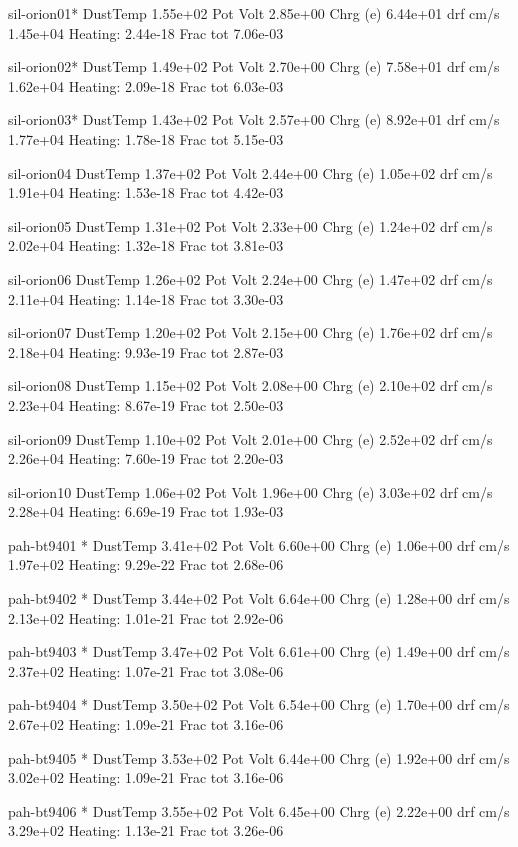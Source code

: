 { sil-orion01*  DustTemp 1.55e+02 Pot Volt 2.85e+00 Chrg (e) 6.44e+01 drf
cm/s 1.45e+04 Heating: 2.44e-18 Frac tot 7.06e-03

 sil-orion02*  DustTemp 1.49e+02 Pot Volt 2.70e+00 Chrg (e) 7.58e+01 drf
cm/s 1.62e+04 Heating: 2.09e-18 Frac tot 6.03e-03

 sil-orion03*  DustTemp 1.43e+02 Pot Volt 2.57e+00 Chrg (e) 8.92e+01 drf
cm/s 1.77e+04 Heating: 1.78e-18 Frac tot 5.15e-03

 sil-orion04   DustTemp 1.37e+02 Pot Volt 2.44e+00 Chrg (e) 1.05e+02 drf
cm/s 1.91e+04 Heating: 1.53e-18 Frac tot 4.42e-03

 sil-orion05   DustTemp 1.31e+02 Pot Volt 2.33e+00 Chrg (e) 1.24e+02 drf
cm/s 2.02e+04 Heating: 1.32e-18 Frac tot 3.81e-03

 sil-orion06   DustTemp 1.26e+02 Pot Volt 2.24e+00 Chrg (e) 1.47e+02 drf
cm/s 2.11e+04 Heating: 1.14e-18 Frac tot 3.30e-03

 sil-orion07   DustTemp 1.20e+02 Pot Volt 2.15e+00 Chrg (e) 1.76e+02 drf
cm/s 2.18e+04 Heating: 9.93e-19 Frac tot 2.87e-03

 sil-orion08   DustTemp 1.15e+02 Pot Volt 2.08e+00 Chrg (e) 2.10e+02 drf
cm/s 2.23e+04 Heating: 8.67e-19 Frac tot 2.50e-03

 sil-orion09   DustTemp 1.10e+02 Pot Volt 2.01e+00 Chrg (e) 2.52e+02 drf
cm/s 2.26e+04 Heating: 7.60e-19 Frac tot 2.20e-03

 sil-orion10   DustTemp 1.06e+02 Pot Volt 1.96e+00 Chrg (e) 3.03e+02 drf
cm/s 2.28e+04 Heating: 6.69e-19 Frac tot 1.93e-03

 pah-bt9401 *  DustTemp 3.41e+02 Pot Volt 6.60e+00 Chrg (e) 1.06e+00 drf
cm/s 1.97e+02 Heating: 9.29e-22 Frac tot 2.68e-06

 pah-bt9402 *  DustTemp 3.44e+02 Pot Volt 6.64e+00 Chrg (e) 1.28e+00 drf
cm/s 2.13e+02 Heating: 1.01e-21 Frac tot 2.92e-06

 pah-bt9403 *  DustTemp 3.47e+02 Pot Volt 6.61e+00 Chrg (e) 1.49e+00 drf
cm/s 2.37e+02 Heating: 1.07e-21 Frac tot 3.08e-06

 pah-bt9404 *  DustTemp 3.50e+02 Pot Volt 6.54e+00 Chrg (e) 1.70e+00 drf
cm/s 2.67e+02 Heating: 1.09e-21 Frac tot 3.16e-06

 pah-bt9405 *  DustTemp 3.53e+02 Pot Volt 6.44e+00 Chrg (e) 1.92e+00 drf
cm/s 3.02e+02 Heating: 1.09e-21 Frac tot 3.16e-06

 pah-bt9406 *  DustTemp 3.55e+02 Pot Volt 6.45e+00 Chrg (e) 2.22e+00 drf
cm/s 3.29e+02 Heating: 1.13e-21 Frac tot 3.26e-06

}
